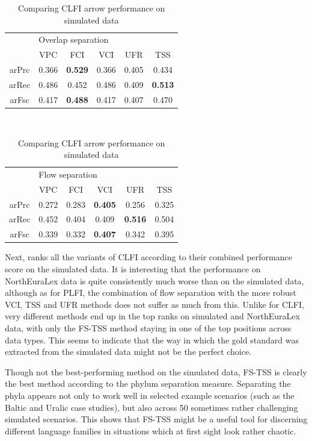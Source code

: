 \begin{table}
 \centering
 \begin{tabular}{cccccc}
  \hline \hline
   & \multicolumn{5}{l}{Overlap separation}\\ 
        &   VPC &   FCI &   VCI &   UFR &   TSS \\ \hline
  arPrc & 0.366 & \textbf{0.529} & 0.366 & 0.405 & 0.434\\
  arRec & 0.486 & 0.452 & 0.486 & 0.409 & \textbf{0.513}\\
  arFsc & 0.417 & \textbf{0.488} & 0.417 & 0.407 & 0.470\\
  \hline
 \end{tabular}\\[0.5cm]
  \begin{tabular}{cccccc}
  \hline \hline
   & \multicolumn{5}{l}{Flow separation}\\ 
        &   VPC &   FCI &   VCI &   UFR &   TSS\\ \hline
  arPrc &  0.272 & 0.283 & \textbf{0.405} & 0.256 & 0.325\\
  arRec & 0.452 & 0.404 & 0.409 & \textbf{0.516} & 0.504\\
  arFsc & 0.339 & 0.332 & \textbf{0.407} & 0.342 & 0.395\\
  \hline
 \end{tabular}
 \caption{Comparing CLFI arrow performance on simulated data}
 \label{contact-arrow-evaluation-simulated}
\end{table}

Next,  ranks all the variants of CLFI according to their combined performance score on the simulated data. It is interesting that the performance on NorthEuraLex data is quite consistently much worse than on the simulated data, although as for PLFI, the combination of flow separation with the more robust VCI, TSS and UFR methods does not suffer as much from this. Unlike for CLFI, very different methods end up in the top ranks on simulated and NorthEuraLex data, with only the FS-TSS method staying in one of the top positions across data types. This seems to indicate that the way in which the gold standard was extracted from the simulated data might not be the perfect choice.

Though not the best-performing method on the simulated data, FS-TSS is clearly the best method according to the phylum separation measure. Separating the phyla appears not only to work well in selected example scenarios (such as the Baltic and Uralic case studies), but also across 50 sometimes rather challenging simulated scenarios. This shows that FS-TSS might be a useful tool for discerning different language families in situations which at first sight look rather chaotic.

